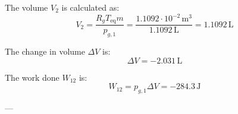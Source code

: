 The volume \( V_2 \) is calculated as:  
\[
V_2 = \frac{R_g T_{\text{eq}} m}{p_{g,1}} = \frac{1.1092 \cdot 10^{-2} \, \text{m}^3}{1.1092 \, \text{L}} = 1.1092 \, \text{L}
\]  

The change in volume \( \Delta V \) is:  
\[
\Delta V = -2.031 \, \text{L}
\]  

The work done \( W_{12} \) is:  
\[
W_{12} = p_{g,1} \Delta V = -284.3 \, \text{J}
\]  

---